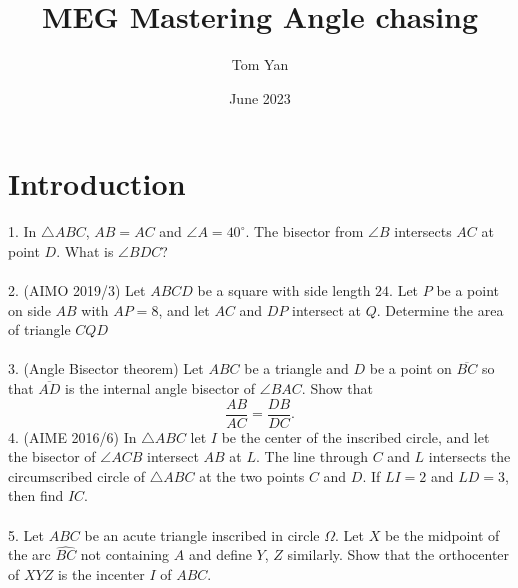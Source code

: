 \documentclass{article}
\title{MEG Mastering Angle chasing}
\author{Tom Yan}
\date{June 2023}
\begin{document}
\maketitle

\section{Introduction}
1. In $\triangle ABC$, $AB = AC$ and $\angle A = 40^{\circ}$. The bisector from $\angle B $ intersects $AC$ at point $D$. What is $\angle BDC$? \\\\
2. (AIMO 2019/3) Let $ABCD$ be a square with side length $24$. Let $P$ be a point on side $AB$ with $AP=8$, and let $AC$ and $DP$ intersect at $Q$. Determine the area of triangle $CQD$\\\\
3. (Angle Bisector theorem) Let $ABC$ be a triangle and $D$ be a point on $\overline{BC}$ so that $\overline{AD}$ is the internal angle bisector of $\angle BAC$. Show that $$\frac{AB}{AC} = \frac{DB}{DC}.$$
4. (AIME 2016/6) In $\triangle ABC$ let $I$ be the center of the inscribed circle, and let the bisector of $\angle ACB$ intersect $AB$ at $L$. The line through $C$ and $L$ intersects the circumscribed circle of $\triangle ABC$ at the two points $C$ and $D$. If $LI=2$ and $LD=3$, then find $IC$.\\\\
5. Let $ABC$ be an acute triangle inscribed in circle $\Omega$. Let $X$ be the midpoint of the arc $\widehat {BC}$ not containing $A$ and define $Y$, $Z$ similarly. Show that the orthocenter of $XYZ$ is the incenter $I$ of $ABC$.\\\\
\end{document}
